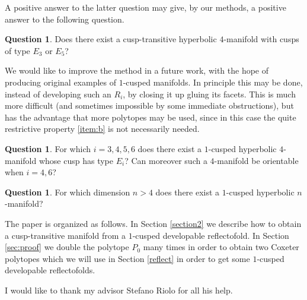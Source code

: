 \documentclass{amsart}
\theoremstyle{definition}
\newtheorem{quest}[lemma]{Question}
\theoremstyle{remark}
\begin{document}
A positive answer to the latter question may give, by our methods, a positive answer to the following question.

\begin{quest}
Does there exist a cusp-transitive hyperbolic $4$-manifold with cusps of type $E_3$ or $E_5$?
\end{quest}

We would like to improve the method in a future work, with the hope of producing original examples of $1$-cusped manifolds. In principle this may be done, instead of developing such an $R_i$, by closing it up gluing its facets. This is much more difficult (and sometimes impossible by some immediate obstructions), but has the advantage that more polytopes may be used, since in this case the quite restrictive property \ref{item:b} is not necessarily needed. %

\begin{quest}
For which $i = 3, 4, 5, 6$ does there exist a $1$-cusped hyperbolic $4$-manifold whose cusp has type $E_i$? Can moreover such a $4$-manifold be orientable when $i = 4, 6$?
\end{quest}

\begin{quest}
For which dimension $n>4$ does there exist a $1$-cusped hyperbolic $n$-manifold?
\end{quest}

The paper is organized as follows. In Section \ref{section2} we describe how to obtain a cusp-transitive manifold from a $1$-cusped developable reflectofold. In Section \ref{sec:proof} we double the polytope $P_0$ many times in order to obtain two Coxeter polytopes which we will use in Section \ref{reflect} in order to get some $1$-cusped developable reflectofolds.

I would like to thank my advisor Stefano Riolo for all his help.
\end{document}
